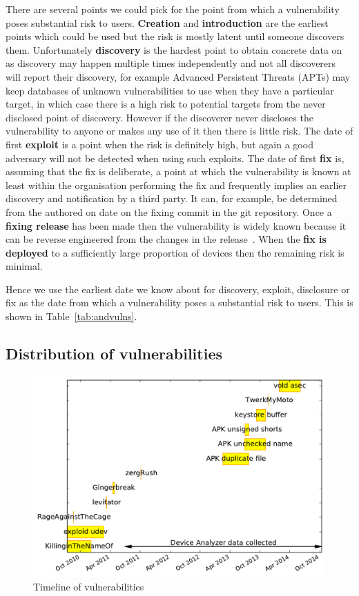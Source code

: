 \documentclass[conference,a4paper,twoside]{IEEEtran}
\begin{document}
There are several points we could pick for the point from which a vulnerability poses substantial risk to users.
{\bf Creation} and {\bf introduction} are the earliest points which could be used but the risk is mostly latent until someone discovers them.
Unfortunately {\bf discovery} is the hardest point to obtain concrete data on as discovery may happen multiple times independently and not all discoverers will report their discovery, for example Advanced Persistent Threats (APTs) may keep databases of unknown vulnerabilities to use when they have a particular target, in which case there is a high risk to potential targets from the never disclosed point of discovery.
However if the discoverer never discloses the vulnerability to anyone or makes any use of it then there is little risk.
The date of first {\bf exploit} is a point when the risk is definitely high, but again a good adversary will not be detected when using such exploits.
The date of first {\bf fix} is, assuming that the fix is deliberate, a point at which the vulnerability is known at least within the organisation performing the fix and frequently implies an earlier discovery and notification by a third party.
It can, for example, be determined from the authored on date on the fixing commit in the git repository.
Once a {\bf fixing release} has been made then the vulnerability is widely known because it can be reverse engineered from the changes in the release~\cite{Brumley2008}.
When the {\bf fix is deployed} to a sufficiently large proportion of devices then the remaining risk is minimal.

Hence we use the earliest date we know about for discovery, exploit, disclosure or fix as the date from which a vulnerability poses a substantial risk to users.
This is shown in Table~\ref{tab:andvulns}.


\subsection{Distribution of vulnerabilities}
\begin{figure}
 \centering
 \includegraphics[width=\columnwidth]{figures/vulnerabilities_timeline}
 \caption{Timeline of vulnerabilities}
 \label{fig:vulnerabilities_timeline}
\end{figure}
\end{document}

